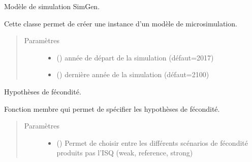 \documentclass[letterpaper,10pt,french]{sphinxmanual}
\begin{document}
\begin{fulllineitems}
\label{\detokenize{utilisation:id5}}
Modèle de simulation SimGen.

Cette classe permet de créer une instance d’un modèle de microsimulation.
\begin{quote}\begin{description}
\item[{Paramètres}] \leavevmode\begin{itemize}
\item {} 
 () \textendash{} année de départ de la simulation (défaut=2017)

\item {} 
 () \textendash{} dernière année de la simulation (défaut=2100)

\end{itemize}

\end{description}\end{quote}

\begin{fulllineitems}
\label{\detokenize{utilisation:simgen.model.birth_assumptions}}
Hypothèses de fécondité.

Fonction membre qui permet de spécifier les hypothèses de fécondité.
\begin{quote}\begin{description}
\item[{Paramètres}] \leavevmode\begin{itemize}
\item {} 
 () \textendash{} Permet de choisir entre les différents scénarios de fécondité produits pas l’ISQ (weak, reference, strong)


\end{itemize}
\end{description}
\end{quote}
\end{fulllineitems}
\end{fulllineitems}
\end{document}
